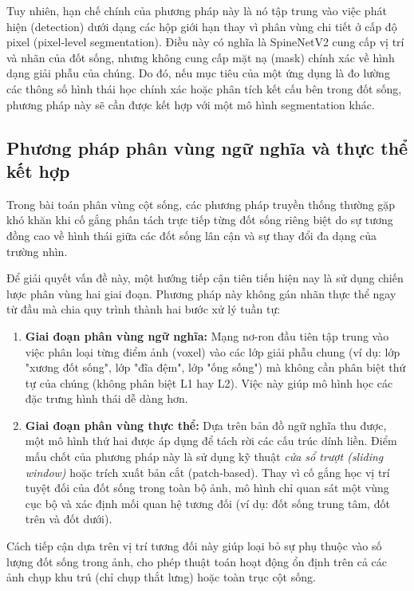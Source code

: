 Tuy nhiên, hạn chế chính của phương pháp này là nó tập trung vào việc phát hiện (detection) dưới dạng các hộp giới hạn thay vì phân vùng chi tiết ở cấp độ pixel (pixel-level segmentation). Điều này có nghĩa là SpineNetV2 cung cấp vị trí và nhãn của đốt sống, nhưng không cung cấp mặt nạ (mask) chính xác về hình dạng giải phẫu của chúng. Do đó, nếu mục tiêu của một ứng dụng là đo lường các thông số hình thái học chính xác hoặc phân tích kết cấu bên trong đốt sống, phương pháp này sẽ cần được kết hợp với một mô hình segmentation khác.\\

\subsection{Phương pháp phân vùng ngữ nghĩa và thực thể kết hợp}
\label{subsec:seg_concept}

Trong bài toán phân vùng cột sống, các phương pháp truyền thống thường gặp khó khăn khi cố gắng phân tách trực tiếp từng đốt sống riêng biệt do sự tương đồng cao về hình thái giữa các đốt sống lân cận và sự thay đổi đa dạng của trường nhìn.

Để giải quyết vấn đề này, một hướng tiếp cận tiên tiến hiện nay là sử dụng chiến lược phân vùng hai giai đoạn. Phương pháp này không gán nhãn thực thể ngay từ đầu mà chia quy trình thành hai bước xử lý tuần tự:

\begin{enumerate}
    \item \textbf{Giai đoạn phân vùng ngữ nghĩa:} 
    Mạng nơ-ron đầu tiên tập trung vào việc phân loại từng điểm ảnh (voxel) vào các lớp giải phẫu chung (ví dụ: lớp "xương đốt sống", lớp "đĩa đệm", lớp "ống sống") mà không cần phân biệt thứ tự của chúng (không phân biệt L1 hay L2). Việc này giúp mô hình học các đặc trưng hình thái dễ dàng hơn.

    \item \textbf{Giai đoạn phân vùng thực thể:}
    Dựa trên bản đồ ngữ nghĩa thu được, một mô hình thứ hai được áp dụng để tách rời các cấu trúc dính liền. Điểm mấu chốt của phương pháp này là sử dụng kỹ thuật \textit{cửa sổ trượt (sliding window)} hoặc trích xuất bản cắt (patch-based). Thay vì cố gắng học vị trí tuyệt đối của đốt sống trong toàn bộ ảnh, mô hình chỉ quan sát một vùng cục bộ và xác định mối quan hệ tương đối (ví dụ: đốt sống trung tâm, đốt trên và đốt dưới).
\end{enumerate}

Cách tiếp cận dựa trên vị trí tương đối này giúp loại bỏ sự phụ thuộc vào số lượng đốt sống trong ảnh, cho phép thuật toán hoạt động ổn định trên cả các ảnh chụp khu trú (chỉ chụp thắt lưng) hoặc toàn trục cột sống.

